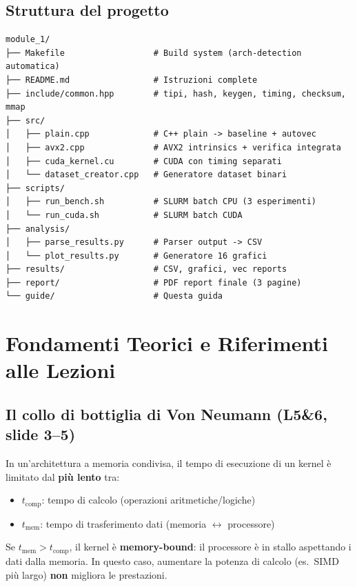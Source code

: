 \documentclass[11pt,a4paper]{article}
\begin{document}
\subsection{Struttura del progetto}
\begin{verbatim}
module_1/
├── Makefile                  # Build system (arch-detection automatica)
├── README.md                 # Istruzioni complete
├── include/common.hpp        # tipi, hash, keygen, timing, checksum, mmap
├── src/
│   ├── plain.cpp             # C++ plain -> baseline + autovec
│   ├── avx2.cpp              # AVX2 intrinsics + verifica integrata
│   ├── cuda_kernel.cu        # CUDA con timing separati
│   └── dataset_creator.cpp   # Generatore dataset binari
├── scripts/
│   ├── run_bench.sh          # SLURM batch CPU (3 esperimenti)
│   └── run_cuda.sh           # SLURM batch CUDA
├── analysis/
│   ├── parse_results.py      # Parser output -> CSV
│   └── plot_results.py       # Generatore 16 grafici
├── results/                  # CSV, grafici, vec reports
├── report/                   # PDF report finale (3 pagine)
└── guide/                    # Questa guida
\end{verbatim}


\section{Fondamenti Teorici e Riferimenti alle Lezioni}
\label{sec:teoria}

\subsection{Il collo di bottiglia di Von Neumann (L5\&6, slide 3--5)}

\begin{theorybox}[title=\textbf{Von Neumann Bottleneck}]
In un'architettura a memoria condivisa, il tempo di esecuzione di un kernel è limitato dal \textbf{più lento} tra:
\begin{itemize}
    \item $t_\text{comp}$: tempo di calcolo (operazioni aritmetiche/logiche)
    \item $t_\text{mem}$: tempo di trasferimento dati (memoria $\leftrightarrow$ processore)
\end{itemize}
Se $t_\text{mem} > t_\text{comp}$, il kernel è \textbf{memory-bound}: il processore è in stallo aspettando i dati dalla memoria. In questo caso, aumentare la potenza di calcolo (es.\ SIMD più largo) \textbf{non} migliora le prestazioni.
\end{theorybox}
\end{document}
